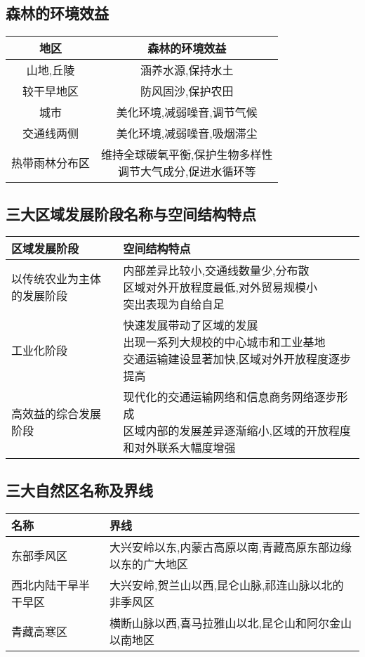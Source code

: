 \documentclass[a4paper]{article}
\begin{document}
    \subsection{森林的环境效益}%
        \begin{tabular}{|c|c|}
            \hline
            地区    &   森林的环境效益  \\
            \hline
            山地,丘陵  &   涵养水源,保持水土  \\
            \hline
            较干早地区  &   防风固沙,保护农田  \\
            \hline
            城市    &   美化环境,减弱噪音,调节气候    \\
            \hline
            交通线两侧  &   美化环境,减弱噪音,吸烟滞尘    \\
            \hline
            热带雨林分布区  &   \makecell[c]{维持全球碳氧平衡,保护生物多样性\\调节大气成分,促进水循环等} \\
            \hline
        \end{tabular}
    \subsection{三大区域发展阶段名称与空间结构特点}
        \begin{tabular}{|p{20mm}|l|}
            \hline
            区域发展阶段    &   空间结构特点    \\
            \hline
            以传统农业为主体的发展阶段  &   \makecell[l]{内部差异比较小,交通线数量少,分布散 \\ 区域对外开放程度最低,对外贸易规模小 \\ 突出表现为自给自足}  \\
            \hline
            工业化阶段  &  \makecell[l]{快速发展带动了区域的发展 \\ 出现一系列大规校的中心城市和工业基地 \\ 交通运输建设显著加快,区域对外开放程度逐步提高} \\
            \hline
            高效益的综合发展阶段    &   \makecell[l]{现代化的交通运输网络和信息商务网络逐步形成 \\ 区域内部的发展差异逐渐缩小,区域的开放程度和对外联系大幅度增强}    \\
            \hline
        \end{tabular}
    \subsection{三大自然区名称及界线}
        \begin{tabular}{|l|l|}
            \hline
            名称    &   界线    \\
            \hline
            东部季风区  &   大兴安岭以东,内蒙古高原以南,青藏高原东部边缘以东的广大地区    \\
            \hline
            西北内陆干旱半干早区    &   大兴安岭,贺兰山以西,昆仑山脉,祁连山脉以北的非季风区   \\
            \hline
            青藏高寒区  &   横断山脉以西,喜马拉雅山以北,昆仑山和阿尔金山以南地区    \\
            \hline
        \end{tabular}
\end{document}
